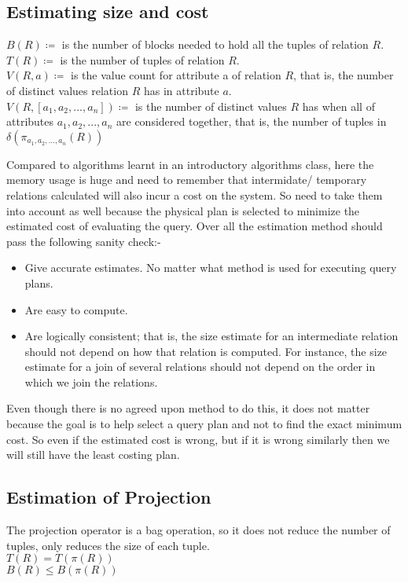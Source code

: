 \subsection{Estimating size and cost}
$B(R) \coloneqq$ is the number of blocks needed to hold all the tuples of relation $R$.\\
$T(R) \coloneqq$ is the number of tuples of relation $R$.\\
$V(R,a) \coloneqq$ is the value count for attribute a of relation $R$, that is, the number of distinct values relation $R$ has in attribute $a$.\\
$V(R, [ a_1 , a_2,..., a_n]) \coloneqq$ is the number of distinct values $R$ has when all of attributes $a_1, a_2,..., a_n$ are considered together, that is, the number of tuples in $\delta(\pi_{a_1,a_2,...,a_n}(R))$
\par Compared to algorithms learnt in an introductory algorithms class, here the memory usage is huge and need to remember that intermidate/ temporary relations calculated will also incur a cost on the system. So need to take them into account as well because the physical plan is selected to minimize the estimated cost of evaluating the query. Over all the estimation method should pass the following sanity check:-
\begin{itemize}
    \item Give accurate estimates. No matter what method is used for executing query plans.
    \item Are easy to compute.
    \item Are logically consistent; that is, the size estimate for an intermediate re­lation should not depend on how that relation is computed. For instance, the size estimate for a join of several relations should not depend on the order in which we join the relations.
\end{itemize}
Even though there is no agreed upon method to do this, it does not matter because the goal is to help select a query plan and not to find the exact minimum cost. So even if the estimated cost is wrong, but if it is wrong similarly then we will still have the least costing plan.

\subsection{Estimation of Projection}
The projection operator is a bag operation, so it does not reduce the number of tuples, only reduces the size of each tuple.\\
$T(R) = T(\pi(R))$\\
$B(R) \leq B(\pi(R))$

